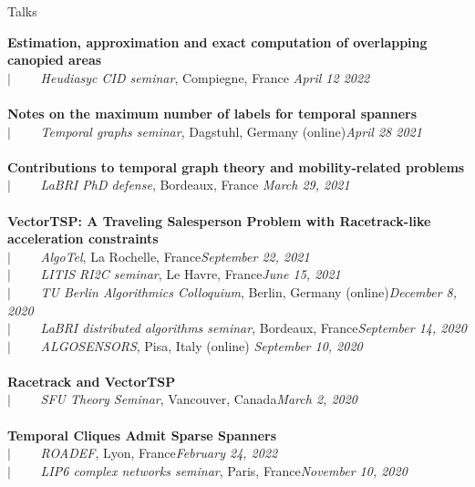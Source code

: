 \documentclass[french]{resume} %
\begin{document}
\begin{rSection}{Talks}

{\bf Estimation, approximation and exact computation of overlapping canopied areas} \\
$| \qquad$ \textit{Heudiasyc CID seminar}, Compiegne, France \hfill {\em April 12 2022} 
\\ \\
{\bf Notes on the maximum number of labels for temporal spanners} \\
$| \qquad$ \textit{Temporal graphs seminar}, Dagstuhl, Germany (online)\hfill {\em April 28 2021} 
\\ \\	
{\bf Contributions to temporal graph theory and mobility-related problems} \\
$| \qquad$ \textit{LaBRI PhD defense}, Bordeaux, France\hfill {\em 
	March 29, 2021} 
\\ \\	
{\bf VectorTSP: A Traveling Salesperson Problem with Racetrack-like acceleration constraints}\\
$| \qquad$ \textit{AlgoTel}, La Rochelle, France\hfill {\em September 22, 2021}\\
$| \qquad$ \textit{LITIS RI2C seminar}, Le Havre, France\hfill {\em June 15, 2021}\\
$| \qquad$ \textit{TU Berlin Algorithmics Colloquium}, Berlin, Germany (online)\hfill {\em December 8, 2020}\\
$| \qquad$ \textit{LaBRI distributed algorithms seminar}, Bordeaux, France\hfill {\em September 14, 2020}\\
$| \qquad$ \textit{ALGOSENSORS}, Pisa, Italy (online) \hfill {\em September 10, 2020} 
\\ \\
{\bf Racetrack and VectorTSP} \\
$| \qquad$ \textit{SFU Theory Seminar}, Vancouver, Canada\hfill {\em March 2, 2020}
\\ \\
{\bf Temporal Cliques Admit Sparse Spanners} \\
$| \qquad$ \textit{ROADEF}, Lyon, France\hfill {\em February 24, 2022} \\
$| \qquad$ \textit{LIP6 complex networks seminar}, Paris, France\hfill {\em November 10, 2020} \\

\end{rSection}
\end{document}
